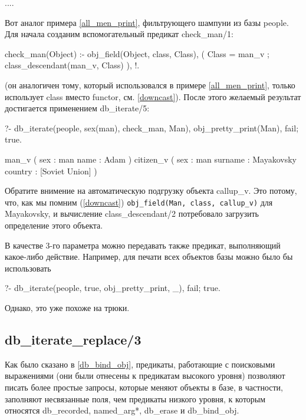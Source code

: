 \documentclass[a4paper]{book}
\def\na{named\_arg*}
\begin{document}
....

Вот аналог примера \ref{all_men_print}, фильтрующего шампуни из
базы people. Для начала созданим вспомогательный предикат
check_man/1:

\begin{example}{}{}
check_man(Object) :- obj_field(Object, class, Class), 
   ( Class = man_v 
   ; class_descendant(man_v, Class)
   ), !.
\end{example}

(он аналогичен тому, который использовался в примере
\ref{all_men_print}, только использует class вместо functor,
см. \ref{downcast}). После этого желаемый результат достигается
применением db_iterate/5:

\begin{example}{}{}
?- db_iterate(people, sex(man), check_man, Man), 
   obj_pretty_print(Man), fail; true.

man_v ( 
  sex : man 
  name : Adam 
) 
citizen_v ( 
  sex : man 
  surname : Mayakovsky 
  country : [Soviet Union] 
) 
\end{example}

Обратите внимение на автоматическую подгрузку объекта
callup_v. Это потому, что, как мы помним (\ref{downcast})
\verb|obj_field(Man, class, callup_v)| для Mayakovsky, и
вычисление class_descendant/2 потребовало загрузить определение
этого объекта.

В качестве 3-го параметра можно передавать также предикат,
выполняющий какое-либо действие. Например, для печати всех
объектов базы можно было бы использовать

\begin{example}{}{}
?- db_iterate(people, true, obj_pretty_print, _), fail; true.
\end{example}

Однако, это уже похоже на трюки.

\subsection{db_iterate_replace/3}
\label{db_iterate_replace/3}

Как было сказано в \ref{db_bind_obj}, предикаты, работающие с
поисковыми выражениями (они были отнесены к предикатам высокого
уровня) позволяют писать более простые запросы, которые меняют
объекты в базе, в частности, заполняют несвязанные поля, чем
предикаты низкого уровня, к которым относятся db_recorded, \na,
db_erase и db_bind_obj.
\end{document}
